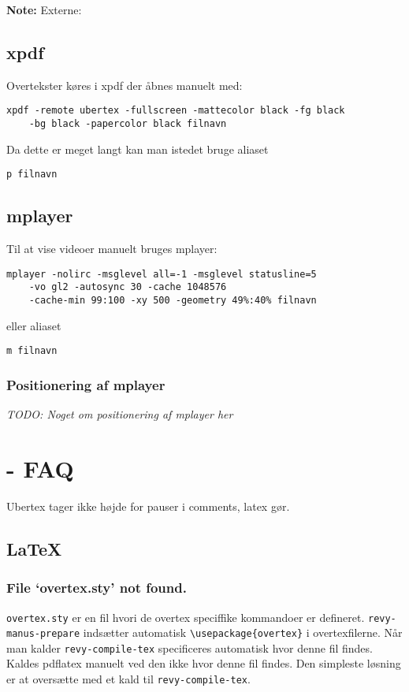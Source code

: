 \documentclass[10pt,a4paper,danish]{article}
\newcommand{\note}[1]{\begin{mdframed}[style=note]\textbf{Note:}
    #1\end{mdframed}}
\newcommand{\code}[1]{\colorbox{verbgray}{\texttt{#1}}}
\begin{document}
\note{Externe:}
\subsection{xpdf}
Overtekster køres i xpdf der åbnes manuelt med:
\begin{verbatim}
xpdf -remote ubertex -fullscreen -mattecolor black -fg black
    -bg black -papercolor black filnavn
\end{verbatim}
Da dette er meget langt kan man istedet bruge aliaset
\begin{verbatim}
p filnavn
\end{verbatim}


\subsection{mplayer}
Til at vise videoer manuelt bruges mplayer:
\begin{verbatim}
mplayer -nolirc -msglevel all=-1 -msglevel statusline=5
    -vo gl2 -autosync 30 -cache 1048576
    -cache-min 99:100 -xy 500 -geometry 49%:40% filnavn
\end{verbatim}
eller aliaset
\begin{verbatim}
m filnavn
\end{verbatim}

\subsubsection{Positionering af mplayer}
\textit{TODO: Noget om positionering af mplayer her}


\section{- FAQ}
Ubertex tager ikke højde for pauser i comments, latex gør.

\subsection{\LaTeX{}}
\subsubsection{File `overtex.sty' not found.}
\texttt{overtex.sty} er en fil hvori de overtex speciffike kommandoer er
defineret. \texttt{revy-manus-prepare} indsætter automatisk
\code{\textbackslash{}usepackage\{overtex\}} i overtexfilerne. Når man kalder
\texttt{revy-compile-tex} specificeres automatisk hvor denne fil findes. Kaldes
pdflatex manuelt ved den ikke hvor denne fil findes.
Den simpleste løsning er at oversætte med et kald til \texttt{revy-compile-tex}.
\end{document}
